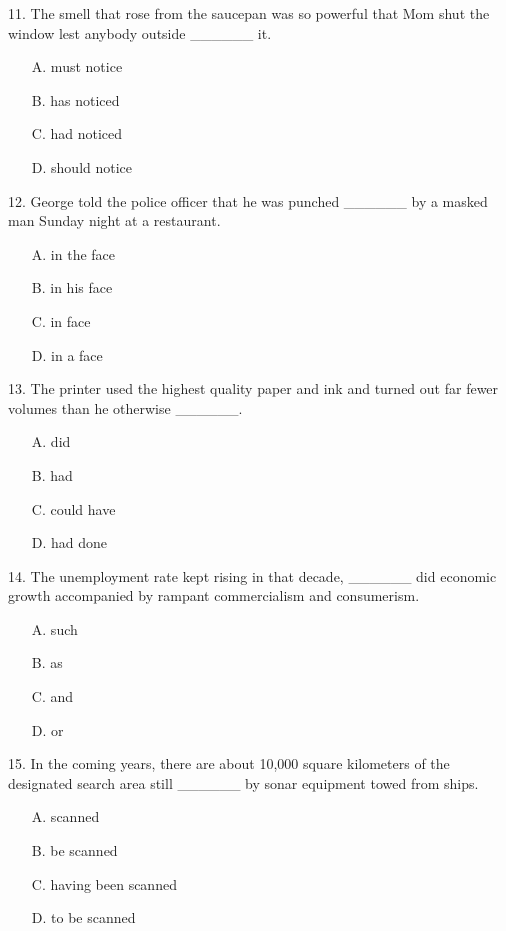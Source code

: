 \documentclass[UTF8,11pt]{ctexart}
\begin{document}
11. The smell that rose from the saucepan was so powerful that Mom shut the window lest anybody outside \_\_\_\_\_\_ it.


\begin{itemize}[leftmargin=2em,itemsep=.2em,topsep=.4em]\item[A.] must notice
\item[B.] has noticed
\item[C.] had noticed
\item[D.] should notice
\end{itemize}

12. George told the police officer that he was punched \_\_\_\_\_\_ by a masked man Sunday night at a restaurant.


\begin{itemize}[leftmargin=2em,itemsep=.2em,topsep=.4em]\item[A.] in the face
\item[B.] in his face
\item[C.] in face
\item[D.] in a face
\end{itemize}

13. The printer used the highest quality paper and ink and turned out far fewer volumes than he otherwise \_\_\_\_\_\_.


\begin{itemize}[leftmargin=2em,itemsep=.2em,topsep=.4em]\item[A.] did
\item[B.] had
\item[C.] could have
\item[D.] had done
\end{itemize}

14. The unemployment rate kept rising in that decade, \_\_\_\_\_\_ did economic growth accompanied by rampant commercialism and consumerism.


\begin{itemize}[leftmargin=2em,itemsep=.2em,topsep=.4em]\item[A.] such
\item[B.] as
\item[C.] and
\item[D.] or
\end{itemize}

15. In the coming years, there are about 10,000 square kilometers of the designated search area still \_\_\_\_\_\_ by sonar equipment towed from ships.


\begin{itemize}[leftmargin=2em,itemsep=.2em,topsep=.4em]\item[A.] scanned
\item[B.] be scanned
\item[C.] having been scanned
\item[D.] to be scanned
\end{itemize}
\end{document}
